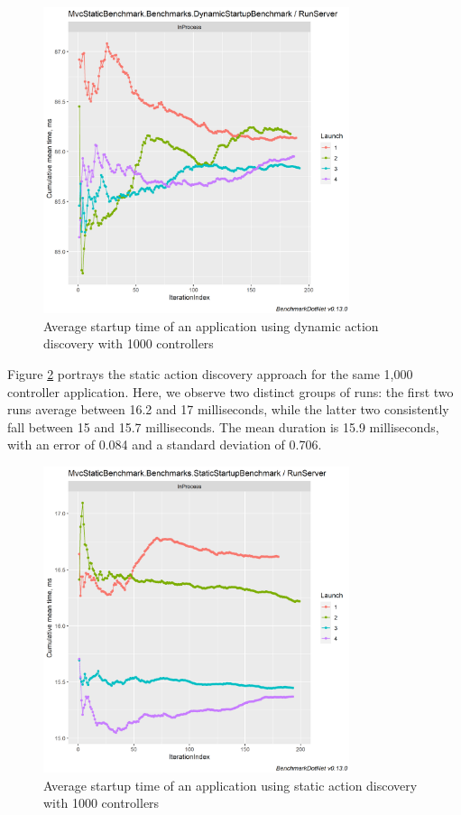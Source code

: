 \begin{figure}[H]
\centering
\includegraphics[width=0.8\textwidth]{graphics/MvcStaticBenchmark.Benchmarks.DynamicStartupBenchmark-RunServer-cummean 1000.png}
\caption{Average startup time of an application using dynamic action discovery with 1000 controllers}
\label{fig:dynamic-startup-1000}
\end{figure}

Figure \ref{fig:static-startup-1000} portrays the static action discovery approach for the same 1,000 controller application. Here, we observe two distinct groups of runs: the first two runs average between 16.2 and 17 milliseconds, while the latter two consistently fall between 15 and 15.7 milliseconds. The mean duration is 15.9 milliseconds, with an error of 0.084 and a standard deviation of 0.706.

\begin{figure}[H]
\centering
\includegraphics[width=0.8\textwidth]{graphics/MvcStaticBenchmark.Benchmarks.StaticStartupBenchmark-RunServer-cummean 1000.png}
\caption{Average startup time of an application using static action discovery with 1000 controllers}
\label{fig:static-startup-1000}
\end{figure}

